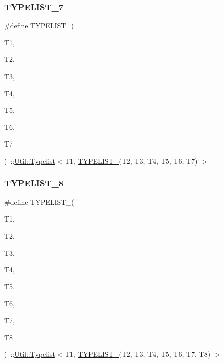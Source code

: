 \subsubsection{\texorpdfstring{TYPELIST\_7}{TYPELIST\_7}}
{\footnotesize\ttfamily \#define T\+Y\+P\+E\+L\+I\+S\+T\+\_(\begin{DoxyParamCaption}\item[{}]{T1,  }\item[{}]{T2,  }\item[{}]{T3,  }\item[{}]{T4,  }\item[{}]{T5,  }\item[{}]{T6,  }\item[{}]{T7 }\end{DoxyParamCaption})~\+::\mbox{\hyperlink{structUtil_1_1Typelist}{Util\+::\+Typelist}}$<$T1, \mbox{\hyperlink{adat__devel__install_2include_2adat_2typelist_8h_ac6f3277dcaade98ceeaa5c0e1c454816}{T\+Y\+P\+E\+L\+I\+S\+T\+\_}}(T2, T3, T4, T5, T6, T7) $>$}

\mbox{\label{adat-devel_2lib_2adat_2typelist_8h_ad828864baaf3cc2505a37b8227c53c20}} 
\subsubsection{\texorpdfstring{TYPELIST\_8}{TYPELIST\_8}}
{\footnotesize\ttfamily \#define T\+Y\+P\+E\+L\+I\+S\+T\+\_(\begin{DoxyParamCaption}\item[{}]{T1,  }\item[{}]{T2,  }\item[{}]{T3,  }\item[{}]{T4,  }\item[{}]{T5,  }\item[{}]{T6,  }\item[{}]{T7,  }\item[{}]{T8 }\end{DoxyParamCaption})~\+::\mbox{\hyperlink{structUtil_1_1Typelist}{Util\+::\+Typelist}}$<$T1, \mbox{\hyperlink{adat__devel__install_2include_2adat_2typelist_8h_aeb724ee75c2a90ed93d4eddef2357a8b}{T\+Y\+P\+E\+L\+I\+S\+T\+\_}}(T2, T3, T4, T5, T6, T7, T8) $>$}

\mbox{\label{adat-devel_2lib_2adat_2typelist_8h_ac938e9eedc71479614ff131e99f58f38}} 
